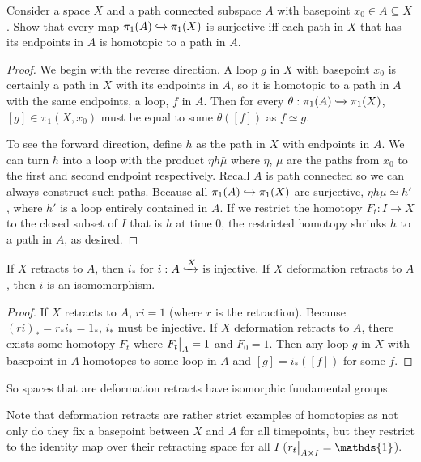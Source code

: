 \documentclass[10pt]{article}
\newcommand\restr[2]{{%
  \left.\kern-\nulldelimiterspace %
  #1 %
  \vphantom{\big|} %
  \right|_{#2} %
}}
\begin{document}
\begin{exercise}[1.1.13]
	Consider a space $X$ and a path connected subspace $A$ with basepoint $x_0
	\in A \subseteq X$. Show that every map $\pi_1(A) \xhookrightarrow{} \pi_1(X)$ is surjective iff each path in $X$ that has its endpoints in $A$ is
	homotopic to a path in $A$.
\end{exercise}

\begin{proof}
	We begin with the reverse direction. A loop $g$ in $X$ with basepoint $x_0$ is
	certainly a path in $X$ with its endpoints in $A$, so it is homotopic to a
	path in $A$ with the same endpoints, a loop, $f$ in $A$. Then for every $\theta:
	\pi_1(A) \xhookrightarrow{} \pi_1(X)$, $[g] \in \pi_1(X, x_0)$ must be equal
	to some $\theta([f])$ as $f \simeq g$.

	To see the forward direction, define $h$ as the path in $X$ with endpoints in
	$A$. We can turn $h$ into a loop with the product $\eta h \bar{\mu}$ where
	$\eta$, $\mu$ are the paths from $x_0$ to the first and second endpoint
	respectively. Recall $A$ is path connected so we can always construct such
	paths. Because all $\pi_1(A) \xhookrightarrow{} \pi_1(X)$ are surjective,
	$\eta h \bar{\mu} \simeq h'$, where $h'$ is a loop entirely contained in $A$.
	If we restrict the homotopy $F_t: I \to X$ to the closed subset of $I$ that
	is $h$ at time 0, the restricted homotopy shrinks $h$ to a path in $A$, as
	desired.

\end{proof}

\begin{proposition}[]
	If $X$ retracts to $A$, then $i_*$ for $i: A \xhookrightarrow X$ is
	injective. If $X$ deformation retracts to $A$, then $i$ is an isomomorphism.
\end{proposition}

\begin{proof}
	If $X$ retracts to $A$, $ri = 1$ (where $r$ is the retraction). Because
	$(ri)_* = r_*i_* = 1_*$, $i_*$ must be injective. If $X$ deformation retracts
	to $A$, there exists some homotopy $F_t$ where $\restr{F_t}{A} = 1$ and $F_0
	= 1$. Then any loop $g$ in $X$ with basepoint in $A$ homotopes to some loop
	in $A$ and $[g] = i_*([f])$ for some $f$.
\end{proof}

So spaces that are deformation retracts have isomorphic fundamental groups.

Note that deformation retracts are rather strict examples of homotopies as not
only do they fix a basepoint between $X$ and $A$ for all timepoints, but they
restrict to the identity map over their retracting space for all $I$
($\restr{r_t}{A\times I} = \mathds{1}$). 
\end{document}

